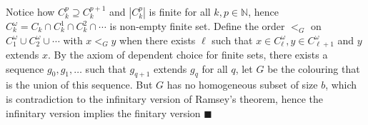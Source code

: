 	\begin{frame}
		Notice how $C_k^p\supseteq C_k^{p+1}$ and $|C_k^p|$ is finite for all $k,p\in\mathbb{N}$, hence $C_k^\omega=C_k\cap C_k^1\cap C_k^2\cap\cdots$ is non-empty finite set.\pause\newline
		Define the order $<_G$ on $C_1^\omega\cup C_2^\omega\cup\cdots$ with $x<_G y$ when there exists $\ell$ such that $x\in C_\ell^\omega,y\in C_{\ell+1}^\omega$ and $y$ extends $x$.\pause\newline
		By the axiom of dependent choice for finite sets, there exists a sequence $g_0,g_1,\ldots$ such that $g_{q+1}$ extends $g_q$ for all $q$, let $G$ be the colouring that is the union of this sequence. \pause But $G$ has no homogeneous subset of size $b$, which is contradiction to the infinitary version of Ramsey's theorem, hence the infinitary version implies the finitary version
		\hfill$\blacksquare$
	\end{frame}

